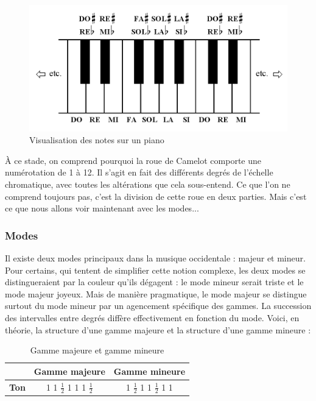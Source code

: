 \documentclass[a4paper,12pt]{article}
\begin{document}
\begin{figure}[!h]
  \begin{center}
    \includegraphics[scale=0.4]{clavier-piano.png}
    \caption{Visualisation des notes sur un piano}
  \end{center}
\end{figure}

À ce stade, on comprend pourquoi la roue de Camelot comporte une numérotation de 1 à 12. Il s'agit en fait des différents degrés de l'échelle chromatique, avec toutes les altérations que cela sous-entend. Ce que l'on ne comprend toujours pas, c'est la division de cette roue en deux parties. Mais c'est ce que nous allons voir maintenant avec les modes...

\newpage

\subsubsection{Modes}

Il existe deux modes principaux dans la musique occidentale : majeur et mineur. Pour certains, qui tentent de simplifier cette notion complexe, les deux modes se distingueraient par la couleur qu'ils dégagent : le mode mineur serait triste et le mode majeur joyeux. Mais de manière pragmatique, le mode majeur se distingue surtout du mode mineur par un agencement spécifique des gammes. La succession des intervalles entre degrés diffère effectivement en fonction du mode. Voici, en théorie, la structure d'une gamme majeure et la structure d'une gamme mineure :

\begin{table}[h]
  \centering
  \begin{tabular}{|c|c|c|}
    \hline
    & \textbf{Gamme majeure} & \textbf{Gamme mineure} \\
    \hline
    \textbf{Ton} & 1 1 $\frac{1}{2}$ 1 1 1 $\frac{1}{2}$ & 1 $\frac{1}{2}$ 1 1 $\frac{1}{2}$ 1 1 \\
    \hline
  \end{tabular}
  \caption{Gamme majeure et gamme mineure}
\end{table}
\end{document}

